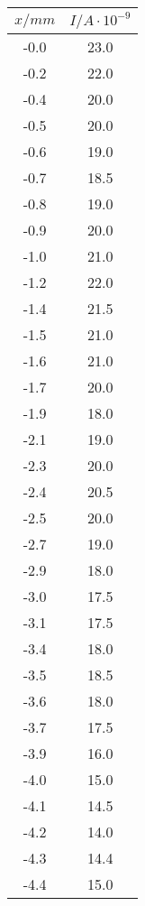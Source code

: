 \begin{table}
    \centering
\begin{minipage}{0.25\textwidth}
    \centering
	\label{tab:b}
	\begin{tabular}{c|c}
		\toprule
		{$x / mm$} & {$I / A\cdot10^{-9}$} \\
		\hline
        \midrule
        -0.0 &23.0\\
        -0.2 &22.0\\
        -0.4 &20.0\\
        -0.5 &20.0\\
        -0.6 &19.0\\
        -0.7 &18.5\\
        -0.8 &19.0\\
        -0.9 &20.0\\
        -1.0 &21.0\\
        -1.2 &22.0\\
        -1.4 &21.5\\
        -1.5 &21.0\\
        -1.6 &21.0\\
        -1.7 &20.0\\
        -1.9 &18.0\\
        -2.1 &19.0\\
        -2.3 &20.0\\
        -2.4 &20.5\\
        -2.5 &20.0\\
        -2.7 &19.0\\
        -2.9 &18.0\\
        -3.0 &17.5\\
        -3.1 &17.5\\
        -3.4 &18.0\\
        -3.5 &18.5\\
        -3.6 &18.0\\
        -3.7 &17.5\\
        -3.9 &16.0\\
        -4.0 &15.0\\
        -4.1 &14.5\\
        -4.2 &14.0\\
        -4.3 &14.4\\
        -4.4 &15.0\\
		\bottomrule 
	\end{tabular}
\end{minipage}
\begin{minipage}{0.25\textwidth}
    \centering
	\label{tab:b}
	\begin{tabular}{c|c}

\end{tabular}
\end{minipage}
\end{table}
